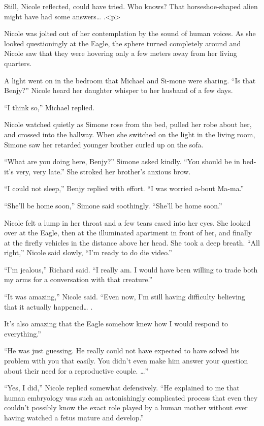 \documentclass[]{article}
\begin{document}
{Still, Nicole reflected, could have tried. Who knows? That horseshoe-shaped alien might have had some answers… .<p>

Nicole was jolted out of her contemplation by the sound of human voices. As she looked questioningly at the Eagle, the sphere turned completely around and Nicole saw that they were hovering only a few meters away from her living quarters.

A light went on in the bedroom that Michael and Si-mone were sharing. “Is that Benjy?” Nicole heard her daughter whisper to her husband of a few days.

“I think so,” Michael replied.

Nicole watched quietly as Simone rose from the bed, pulled her robe about her, and crossed into the hallway. When she switched on the light in the living room, Simone saw her retarded younger brother curled up on the sofa.

“What are you doing here, Benjy?” Simone asked kindly. “You should be in bed-it’s very, very late.” She stroked her brother’s anxious brow.

“I could not sleep,” Benjy replied with effort. “I was worried a-bout Ma-ma.”

“She’ll be home soon,” Simone said soothingly. “She’ll be home soon.”

Nicole felt a lump in her throat and a few tears eased into her eyes. She looked over at the Eagle, then at the illuminated apartment in front of her, and finally at the firefly vehicles in the distance above her head. She took a deep breath. “All right,” Nicole said slowly, “I’m ready to do die video.”

“I’m jealous,” Richard said. “I really am. I would have been willing to trade both my arms for a conversation with that creature.”

“It was amazing,” Nicole said. “Even now, I’m still having difficulty believing that it actually happened… .

It’s also amazing that the Eagle somehow knew how I would respond to everything.”

“He was just guessing. He really could not have expected to have solved his problem with you that easily. You didn’t even make him answer your question about their need for a reproductive couple. …”

“Yes, I did,” Nicole replied somewhat defensively. “He explained to me that human embryology was such an astonishingly complicated process that even they couldn’t possibly know the exact role played by a human mother without ever having watched a fetus mature and develop.”

}
\end{document}
